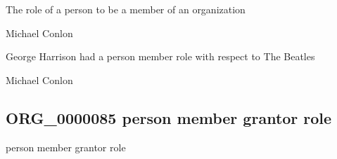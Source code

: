 \documentclass[letterpaper,10pt,english]{sphinxmanual}
\begin{document}
\begin{sphinxShadowBox}

\sphinxAtStartPar
{\hyperref[\detokenize{doc-BFO_0000023::doc}]{}}
\end{sphinxShadowBox}

\begin{sphinxShadowBox}

\sphinxAtStartPar
The role of a person to be a member of an organization
\end{sphinxShadowBox}

\begin{sphinxShadowBox}

\sphinxAtStartPar
Michael Conlon 
\end{sphinxShadowBox}

\begin{sphinxShadowBox}

\sphinxAtStartPar
George Harrison had a person member role with respect to The Beatles
\end{sphinxShadowBox}

\begin{sphinxShadowBox}

\sphinxAtStartPar
Michael Conlon 
\end{sphinxShadowBox}
\begin{quote}

\ignorespaces \end{quote}


\subsection{ORG\_0000085 \sphinxhyphen{} person member grantor role}
\label{\detokenize{doc-ORG_0000085:org-0000085-person-member-grantor-role}}\label{\detokenize{doc-ORG_0000085:index-0}}\label{\detokenize{doc-ORG_0000085::doc}}
\begin{sphinxShadowBox}

\sphinxAtStartPar
person member grantor role
\end{sphinxShadowBox}
\end{document}
